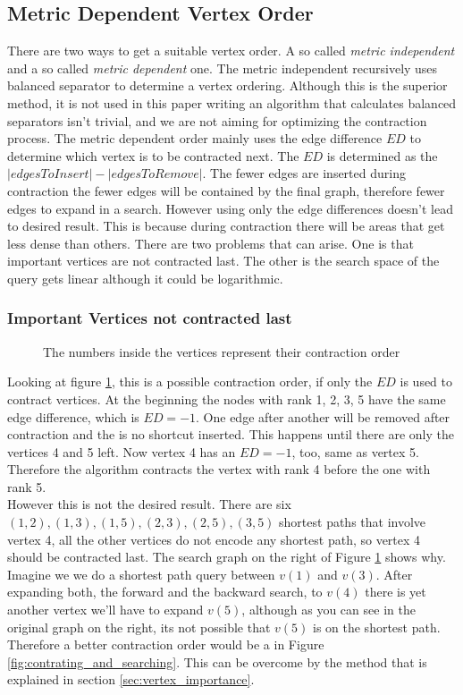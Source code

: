 \subsection{Metric Dependent Vertex Order}
There are two ways to get a suitable vertex order. A so called \textit{metric independent} and a so called \textit{metric dependent} one. The metric independent recursively uses balanced separator to determine a vertex ordering\cite{CCH}. Although this is the superior method, it is not used in this paper writing an algorithm that calculates balanced separators isn't trivial, and we are not aiming for optimizing the contraction process. 
The metric dependent order mainly uses the edge difference $ED$ to determine which vertex is to be contracted next. The $ED$ is determined as the $|edges To Insert| - |edges To Remove|$. The fewer edges are inserted during contraction the fewer edges will be contained by the final graph, therefore fewer edges to expand in a search. However using only the edge differences doesn't lead to desired result. This is because during contraction there will be areas that get less dense than others. 
There are two problems that can arise. One is that important vertices are not contracted last. The other is the search space of the query gets linear although it could be logarithmic.

\subsubsection{Important Vertices not contracted last}\label{sec:not_contracted_last}

\begin{figure}
    \centering
    
    \caption{The numbers inside the vertices represent their contraction order}
    \label{fig:not_contracted_last}
\end{figure}

Looking at figure \ref{fig:not_contracted_last}, this is a possible contraction order, if only the $ED$ is used to contract vertices. At the beginning the nodes with rank 1, 2, 3, 5 have the same edge difference, which is $ED = -1$. One edge after another will be removed after contraction and the is no shortcut inserted. This happens until there are only the vertices 4 and 5 left. Now vertex 4 has an $ED=-1$, too, same as vertex 5. Therefore the algorithm contracts the vertex with rank 4 before the one with rank 5. \\
However this is not the desired result. There are six ${(1,2), (1,3), (1,5), (2,3), (2,5), (3,5)}$ shortest paths that involve vertex 4, all the other vertices do not encode any shortest path, so vertex 4 should be contracted last. The search graph on the right of Figure \ref{fig:not_contracted_last} shows why. Imagine we we do a shortest path query between $v(1)$ and $v(3)$. After expanding both, the forward and the backward search, to $v(4)$ there is yet another vertex we'll have to expand $v(5)$, although 
as you can see in the original graph on the right, its not possible that $v(5)$ is on the shortest path. Therefore a better contraction order would be a in Figure \ref{fig:contrating_and_searching}.  This can be overcome by the method that is explained in section \ref{sec:vertex_importance}.

